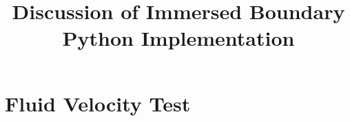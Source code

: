\documentclass[11pt]{amsart}
\begin{document}
\title{Discussion of Immersed Boundary Python Implementation} 

\maketitle

\section{Fluid Velocity Test}
\end{document}
